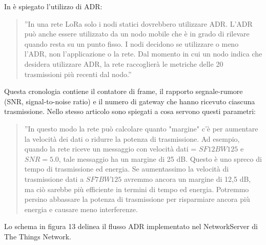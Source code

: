 \documentclass[a4paper]{report} %
\begin{document}
In \cite{art:rif.32} è spiegato l'utilizzo di ADR:
\begin{quote}
	''In una rete LoRa solo i nodi statici dovrebbero utilizzare ADR. L'ADR può anche essere utilizzato da un nodo mobile che è in grado di rilevare quando resta su un punto fisso. I nodi decidono se utilizzare o meno l'ADR, non l'applicazione o la rete. Dal momento in cui un nodo indica che desidera utilizzare ADR, la rete raccoglierà le metriche delle 20 trasmissioni più recenti dal nodo.''
\end{quote}
Questa cronologia contiene il contatore di frame, il rapporto segnale-rumore (SNR, signal-to-noise ratio) e il numero di gateway che hanno ricevuto ciascuna trasmissione. Nello stesso articolo sono spiegati a cosa servono questi parametri:
\begin{quote}
	''In questo modo la rete può calcolare quanto "margine" c'è per aumentare la velocità dei dati o ridurre la potenza di trasmissione. Ad esempio, quando la rete riceve un messaggio con velocità dati = $SF12BW125$ e $SNR = 5.0$, tale messaggio ha un margine di 25 dB. Questo è uno spreco di tempo di trasmissione ed energia. Se aumentassimo la velocità di trasmissione dati a $SF7BW125$ avremmo ancora un margine di 12,5 dB, ma ciò sarebbe più efficiente in termini di tempo ed energia. Potremmo persino abbassare la potenza di trasmissione per risparmiare ancora più energia e causare meno interferenze. 
\end{quote}	
Lo schema in figura 13 delinea il flusso ADR implementato nel NetworkServer di The Things Network.
\end{document}
